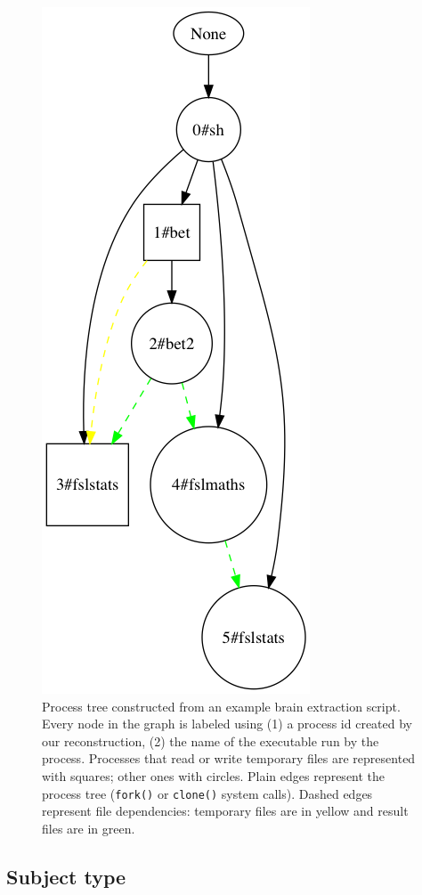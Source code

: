 \documentclass[a4paper,num-refs]{oup-contemporary}
\begin{document}
\begin{figure}
\centering
  \includegraphics[scale=0.3]{images/simple_graph}
  \caption{Process tree constructed from an example brain extraction
	script. Every node in the graph is labeled using (1) a process id 
	created by our reconstruction, (2) the name of the executable run 
	by the process. Processes that read or write temporary files are 
	represented with squares; other ones with circles. Plain edges 
	represent the process tree (\texttt{fork()} or \texttt{clone()} 
	system calls). Dashed edges represent file dependencies: temporary 
	files are in yellow and result files are in green.}
  \label{fig:simple_script}
\end{figure}

\subsection{Subject type}
\end{document}
